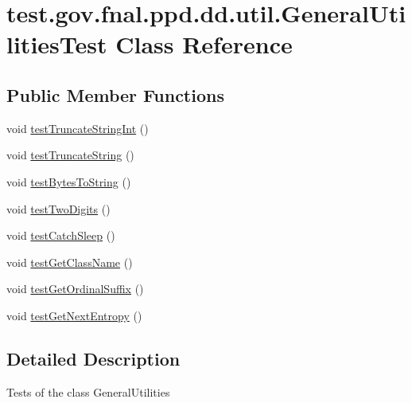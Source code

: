 \hypertarget{classtest_1_1gov_1_1fnal_1_1ppd_1_1dd_1_1util_1_1GeneralUtilitiesTest}{\section{test.\-gov.\-fnal.\-ppd.\-dd.\-util.\-General\-Utilities\-Test Class Reference}
\label{classtest_1_1gov_1_1fnal_1_1ppd_1_1dd_1_1util_1_1GeneralUtilitiesTest}
}
\subsection*{Public Member Functions}
\begin{DoxyCompactItemize}
\item 
void \hyperlink{classtest_1_1gov_1_1fnal_1_1ppd_1_1dd_1_1util_1_1GeneralUtilitiesTest_a2a569dd4b558b52e05a9a601723c89ab}{test\-Truncate\-String\-Int} ()
\item 
void \hyperlink{classtest_1_1gov_1_1fnal_1_1ppd_1_1dd_1_1util_1_1GeneralUtilitiesTest_a18e32629566528e522ed8cff26d71868}{test\-Truncate\-String} ()
\item 
void \hyperlink{classtest_1_1gov_1_1fnal_1_1ppd_1_1dd_1_1util_1_1GeneralUtilitiesTest_aa08d9d90948722b761d9fa8df08ebd13}{test\-Bytes\-To\-String} ()
\item 
void \hyperlink{classtest_1_1gov_1_1fnal_1_1ppd_1_1dd_1_1util_1_1GeneralUtilitiesTest_a00c7b74012967f81451b2f0a7f7add98}{test\-Two\-Digits} ()
\item 
void \hyperlink{classtest_1_1gov_1_1fnal_1_1ppd_1_1dd_1_1util_1_1GeneralUtilitiesTest_ae2062967e8e894603710ffc318b67d77}{test\-Catch\-Sleep} ()
\item 
void \hyperlink{classtest_1_1gov_1_1fnal_1_1ppd_1_1dd_1_1util_1_1GeneralUtilitiesTest_a0a93846509e9a8c51d5f557c686777cf}{test\-Get\-Class\-Name} ()
\item 
void \hyperlink{classtest_1_1gov_1_1fnal_1_1ppd_1_1dd_1_1util_1_1GeneralUtilitiesTest_a23f44e50d284c5bd8eb67a8eabe210c6}{test\-Get\-Ordinal\-Suffix} ()
\item 
void \hyperlink{classtest_1_1gov_1_1fnal_1_1ppd_1_1dd_1_1util_1_1GeneralUtilitiesTest_a046b1a0f43d4b898dceb0c4e85010f58}{test\-Get\-Next\-Entropy} ()
\end{DoxyCompactItemize}


\subsection{Detailed Description}
Tests of the class General\-Utilities

